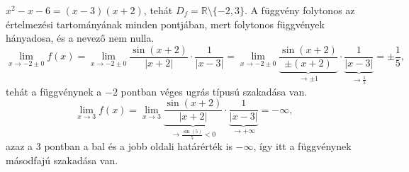 \documentclass[11pt]{scrartcl}
\begin{document}
$x^2 - x - 6 = (x - 3)(x + 2)$, tehát
$D_f = \mathbb{R} \setminus \{-2, 3\}$. A függvény folytonos az
értelmezési tartományának minden pontjában, mert folytonos
függvények hányadosa, és a nevező nem nulla.
\[
	\lim_{x \to -2 \pm 0} f(x)
	= \lim_{x \to -2 \pm 0} \frac{\sin(x + 2)}{|x + 2|} \cdot \frac{1}{|x - 3|}
	=
	\lim_{x \to -2 \pm 0}
	\underbrace{\frac{\sin(x + 2)}{\pm (x + 2)}}_{\to \pm 1} \cdot
	\underbrace{\frac{1}{|x - 3|}}_{\to \frac{1}{5}}
	=
	\pm \frac{1}{5},
\]
tehát a függvénynek a $-2$ pontban véges ugrás típusú szakadása van.
\[
	\lim_{x \to 3} f(x)
	= \lim_{x \to 3}
	\underbrace{\frac{\sin(x + 2)}{|x + 2|}}_{\to \frac{\sin(5)}{5} < 0} \cdot
	\underbrace{\frac{1}{|x - 3|}}_{\to +\infty}
	= -\infty,
\]
azaz a $3$ pontban a bal és a jobb oldali határérték is $-\infty$, így itt a
függvénynek másodfajú szakadása van.
\end{document}
